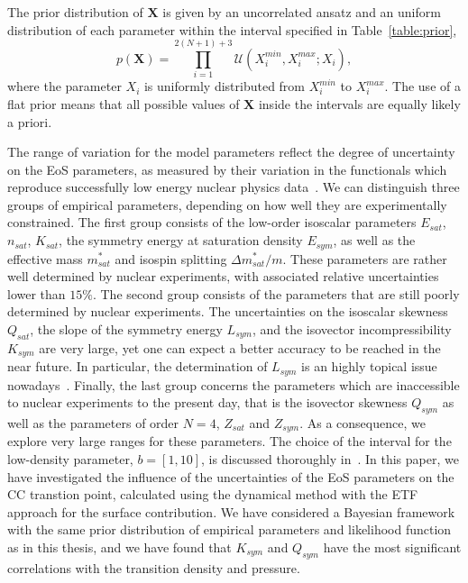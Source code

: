 The prior distribution of $\bm{X}$ is given by an uncorrelated ansatz and an
uniform distribution of each parameter within the interval specified in
Table~\ref{table:prior},
%
\begin{equation}
  p(\bm{X}) = \prod_{i=1}^{2(N+1)+3} \mathcal{U}(X_i^{min}, X_i^{max};X_i),
\end{equation}
%
where the parameter $X_i$ is uniformly distributed from $X_i^{min}$ to 
$X_i^{max}$. The use of a flat prior means that all possible values of 
$\bm{X}$ inside the intervals are equally likely a priori.

The range of variation for the model parameters reflect the degree of 
uncertainty on the EoS parameters, as measured by their variation in the 
functionals which reproduce successfully low energy nuclear physics
data~\cite{Margueron2018a}. We can distinguish three groups of empirical  
parameters, depending on how well they are experimentally constrained. The 
first group consists of the low-order isoscalar parameters $E_{sat}$, 
$n_{sat}$, $K_{sat}$, the symmetry energy at saturation density $E_{sym}$, as 
well as the effective mass $m_{sat}^*$ and isospin splitting 
$\Delta m_{sat}^*/m$. These parameters are rather well determined by nuclear 
experiments, with associated relative uncertainties lower than $15\%$. The 
second group consists of the parameters that are still poorly determined by 
nuclear experiments. The uncertainties on the isoscalar skewness $Q_{sat}$, the 
slope of the symmetry energy $L_{sym}$, and the isovector incompressibility 
$K_{sym}$ are very large, yet one can expect a better accuracy to be 
reached in the near future. In particular, the determination of $L_{sym}$ is 
an highly topical issue nowadays~\cite{Li2014}. Finally, the last group 
concerns the parameters which are inaccessible to nuclear experiments to the 
present day, that is the isovector skewness $Q_{sym}$ as well as the parameters 
of order $N=4$, $Z_{sat}$ and $Z_{sym}$. As a consequence, we explore very 
large ranges for these parameters. 
The choice of the interval for the low-density parameter, $b = [1,10]$, is 
discussed thoroughly in~\cite{Antic2019}. {In this paper, we have 
  investigated the influence of the uncertainties of the EoS parameters on the
CC transtion point, calculated using the dynamical method with the ETF
approach for the surface contribution. We have considered a Bayesian framework
with the same prior distribution of empirical parameters and likelihood 
function as in this thesis, and we have found that $K_{sym}$ and $Q_{sym}$ have 
the most significant correlations with the transition density and pressure.}

